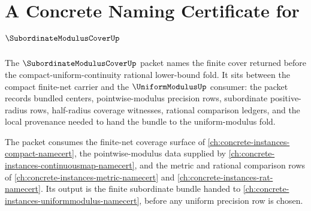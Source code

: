 \chapter{A Concrete Naming Certificate for $\SubordinateModulusCoverUp$}
\label{ch:concrete-instances-subordinatemoduluscover-namecert}

The $\SubordinateModulusCoverUp$ packet names the finite cover returned before the compact-uniform-continuity rational lower-bound fold. It sits between the compact finite-net carrier and the $\UniformModulusUp$ consumer: the packet records bundled centers, pointwise-modulus precision rows, subordinate positive-radius rows, half-radius coverage witnesses, rational comparison ledgers, and the local provenance needed to hand the bundle to the uniform-modulus fold.

The packet consumes the finite-net coverage surface of \autoref{ch:concrete-instances-compact-namecert}, the pointwise-modulus data supplied by \autoref{ch:concrete-instances-continuousmap-namecert}, and the metric and rational comparison rows of \autoref{ch:concrete-instances-metric-namecert} and \autoref{ch:concrete-instances-rat-namecert}. Its output is the finite subordinate bundle handed to \autoref{ch:concrete-instances-uniformmodulus-namecert}, before any uniform precision row is chosen.

